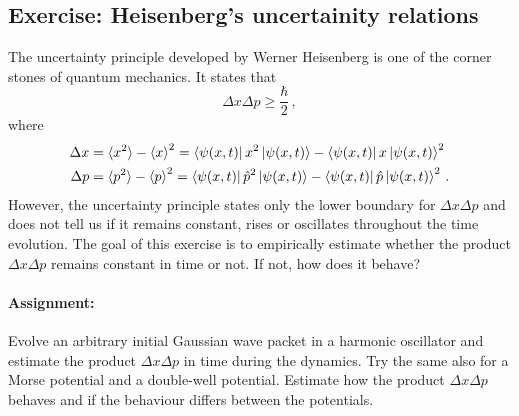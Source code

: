 \subsection*{Exercise: Heisenberg's uncertainity relations}

The uncertainty principle developed by Werner Heisenberg is one of the corner stones of quantum mechanics. It states that
\begin{equation*}
    \Delta x \Delta p \ge \frac{\hbar}{2} \, , 
\end{equation*}
where
\begin{align*}
    \Delta x &= \braket{x^2} - \braket{x}^2 = \bra{\psi(x, t)}x^2\ket{\psi(x,t)} -  \bra{\psi(x, t)}x\ket{\psi(x,t)}^2\\
    \Delta p &= \braket{p^2} - \braket{p}^2 = \bra{\psi(x, t)}\hat{p}^2\ket{\psi(x,t)} -  \bra{\psi(x, t)}\hat{p}\ket{\psi(x,t)}^2 \, .
\end{align*}
However, the uncertainty principle states only the lower boundary for $\Delta x \Delta p$ and does not tell us if it remains constant, rises or oscillates throughout the time evolution. The goal of this exercise is to empirically estimate whether the product $ \Delta x \Delta p$ remains constant in time or not. If not, how does it behave?

\paragraph{Assignment:} Evolve an arbitrary initial Gaussian wave packet in a harmonic oscillator and estimate the product $\Delta x \Delta p$ in time during the dynamics. Try the same also for a Morse potential and a double-well potential. Estimate how the product $\Delta x \Delta p$ behaves and if the behaviour differs between the potentials.